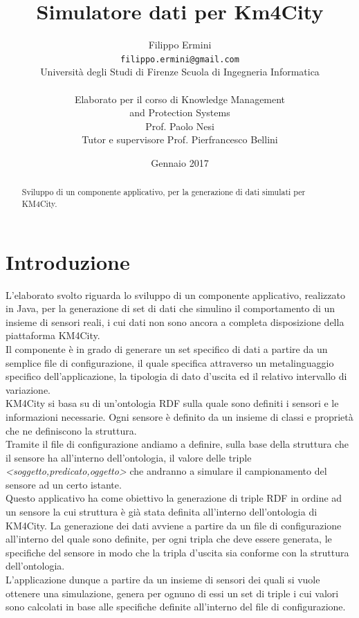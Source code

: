 \documentclass[12pt,a4paper,italian]{article}
\title{\Huge Simulatore dati per Km4City} %
\author{Filippo Ermini\\
	{\tt\small filippo.ermini@gmail.com}\\\small{Università degli Studi di Firenze Scuola di Ingegneria Informatica}\\\\Elaborato per il corso di Knowledge Management \\and Protection Systems\\ Prof. Paolo Nesi\\
	\newline
	\small{Tutor e supervisore Prof. Pierfrancesco Bellini}\\}
\date{Gennaio 2017}
\begin{document}
	\maketitle %
	\thispagestyle{empty}
\begin{abstract}
	Sviluppo di un componente applicativo, per la generazione di dati simulati per KM4City.
\end{abstract}
	\newpage
	\tableofcontents
	\thispagestyle{empty}
	\newpage
	
\section{Introduzione}
\thispagestyle{plain}
L'elaborato svolto riguarda lo sviluppo di un componente applicativo, realizzato in Java, per la generazione di set di dati che simulino il comportamento di un insieme 
di sensori reali, i cui dati non sono ancora a completa disposizione della piattaforma KM4City.\\
Il componente è in grado di generare un set specifico di dati a partire da un semplice file di configurazione, il quale specifica attraverso un metalinguaggio specifico dell'applicazione, 
la tipologia di dato d'uscita ed il relativo intervallo di variazione.\\
KM4City si basa su di un'ontologia RDF sulla quale sono definiti i sensori e le informazioni necessarie. Ogni sensore è definito da un insieme di classi e proprietà che
ne definiscono la struttura.\\
Tramite il file di configurazione andiamo a definire, sulla base della struttura che il sensore ha all'interno dell'ontologia, il valore delle triple \emph{<soggetto,predicato,oggetto>} che andranno
a simulare il campionamento del sensore ad un certo istante.\\
\newline
Questo applicativo ha come obiettivo la generazione di triple RDF in ordine ad un sensore la cui struttura è già stata definita all'interno dell'ontologia di KM4City.
La generazione dei dati avviene a partire da un file di configurazione all'interno del quale sono definite, per ogni tripla che deve essere generata, le specifiche del sensore in modo che 
la tripla d'uscita sia conforme con la struttura dell'ontologia.\\
L'applicazione dunque a partire da un insieme di sensori dei quali si vuole
ottenere una simulazione, genera per ognuno di essi un set di triple i cui valori sono calcolati in base alle specifiche definite all'interno 
del file di configurazione.\\
\newpage
\end{document}
